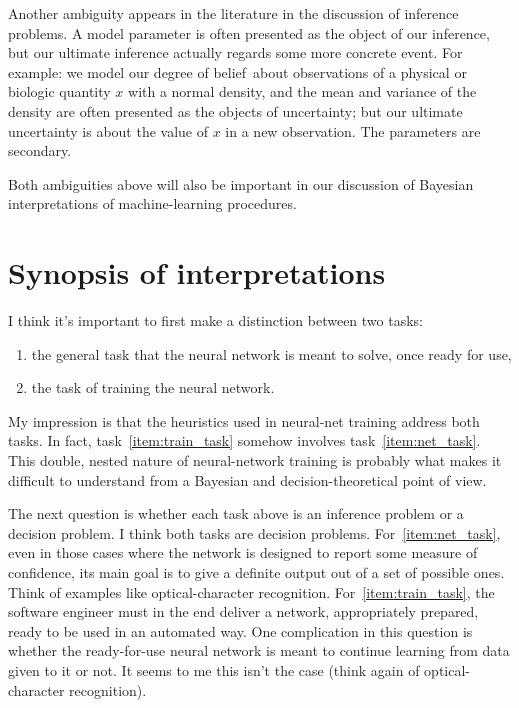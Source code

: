 \documentclass[\ifafour a4paper,12pt,\else a5paper,10pt,\fi%
onecolumn,oneside,article,%
british%
]{memoir}
\theoremstyle{remark}
\theoremstyle{innote}
\renewcommand*{\|}{\mathpunct{|}}
\newcommand*{\dob}{degree of belief}
\begin{document}
Another ambiguity appears in the literature in the discussion of inference
problems. A model parameter is often presented as the object of our
inference, but our ultimate inference actually regards some more concrete
event. For example: we model our \dob\ about observations of a physical or
biologic quantity $x$ with a normal density, and the mean and variance of
the density are often presented as the objects of uncertainty; but our
ultimate uncertainty is about the value of $x$ in a new observation. The
parameters are secondary.

Both ambiguities above will also be important in our discussion of Bayesian
interpretations of machine-learning procedures.


\section{Synopsis of interpretations}
\label{sec:synopsis_interpretations}

I think it's important to first make a distinction between two tasks:
\begin{enumerate}[label=(\Alph*)]
\item\label{item:net_task}the general task that the neural network is meant
  to solve, once ready for use,
\item\label{item:train_task}the task of training the neural network.
\end{enumerate}
My impression is that the heuristics used in neural-net training address
both tasks. In fact, task~\ref{item:train_task} somehow involves
task~\ref{item:net_task}. This double, nested nature of neural-network
training is probably what makes it difficult to understand from a Bayesian
and decision-theoretical point of view.

The next question is whether each task above is an inference problem or a
decision problem. I think both tasks are decision problems.
For~\ref{item:net_task}, even in those cases where the network is designed
to report some measure of confidence, its main goal is to give a definite
output out of a set of possible ones. Think of examples like
optical-character recognition. For~\ref{item:train_task}, the software
engineer must in the end deliver a network, appropriately prepared, ready
to be used in an automated way. One complication in this question is
whether the ready-for-use neural network is meant to continue learning from
data given to it or not. It seems to me this isn't the case (think again of
optical-character recognition).
\end{document}
